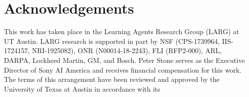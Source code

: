 \documentclass[letterpaper]{article}
\begin{document}
\vspace{-3.49mm}
\section*{Acknowledgements}
This work has taken place in the Learning Agents Research
Group (LARG) at UT Austin.  LARG research is supported in part by NSF
(CPS-1739964, IIS-1724157, NRI-1925082), ONR (N00014-18-2243), FLI
(RFP2-000), ARL, DARPA, Lockheed Martin, GM, and Bosch.  Peter Stone
serves as the Executive Director of Sony AI America and receives
financial compensation for this work.  The terms of this arrangement
have been reviewed and approved by the University of Texas at Austin
in accordance with its


\clearpage


\end{document}
